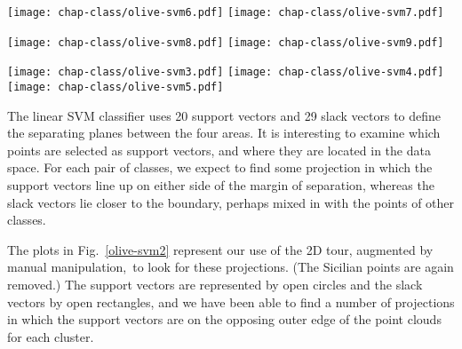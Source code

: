\begin{figure*}[htbp]
\centerline{{\texttt{[image: chap-class/olive-svm6.pdf]}}
 {\texttt{[image: chap-class/olive-svm7.pdf]}}}
\smallskip

\centerline{{\texttt{[image: chap-class/olive-svm8.pdf]}}
 {\texttt{[image: chap-class/olive-svm9.pdf]}}}
\caption[Misclassifications of a support vector machine classifying
 the oils of the South]{Misclassifications of a support vector machine
 classifying the oils of the South by .  The
 misclassification table {\bf (left)} is linked to 2D tour plots {\bf
 (right)}; different misclassifications are examined in each row of
 plots. (The oils from Sicily, the fourth area, have been removed from
 all plots.)  }
\label{olive-svm}
\end{figure*}

\begin{figure*}[htbp]
\centerline{
 {\texttt{[image: chap-class/olive-svm3.pdf]}}
 {\texttt{[image: chap-class/olive-svm4.pdf]}}
 {\texttt{[image: chap-class/olive-svm5.pdf]}}}
\caption[Using the tour to examine the choice of support
vectors]{Using the tour to examine the choice of support vectors when
classifying Southern oils by .  Support vectors are open
circles, and slack vectors are open rectangles; the data points are
represented by $+$es and $\times$es.}
\label{olive-svm2}
\end{figure*}

The linear SVM classifier uses 20 support vectors and 29 slack vectors
to define the separating planes between the four areas. It is
interesting to examine which points are selected as support vectors,
and where they are located in the data space.  For each pair of
classes, we expect to find some projection in which the support vectors
line up on either side of the margin of separation, whereas the slack
vectors lie closer to the boundary, perhaps mixed in with the points
of other classes.

  The plots in
Fig.~\ref{olive-svm2} represent our use of the 2D tour, augmented by
manual manipulation,~to look for these projections.  (The Sicilian
points are again removed.) The support vectors are represented by open
circles and the slack vectors by open rectangles, and we have been
able to find a number of projections in which the support vectors are
on the opposing outer edge of the point clouds for each cluster.

